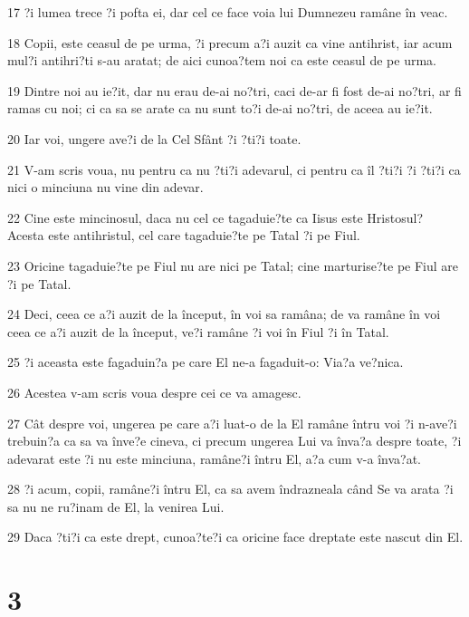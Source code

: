 \par 17 ?i lumea trece ?i pofta ei, dar cel ce face voia lui Dumnezeu ramâne în veac.
\par 18 Copii, este ceasul de pe urma, ?i precum a?i auzit ca vine antihrist, iar acum mul?i antihri?ti s-au aratat; de aici cunoa?tem noi ca este ceasul de pe urma.
\par 19 Dintre noi au ie?it, dar nu erau de-ai no?tri, caci de-ar fi fost de-ai no?tri, ar fi ramas cu noi; ci ca sa se arate ca nu sunt to?i de-ai no?tri, de aceea au ie?it.
\par 20 Iar voi, ungere ave?i de la Cel Sfânt ?i ?ti?i toate.
\par 21 V-am scris voua, nu pentru ca nu ?ti?i adevarul, ci pentru ca îl ?ti?i ?i ?ti?i ca nici o minciuna nu vine din adevar.
\par 22 Cine este mincinosul, daca nu cel ce tagaduie?te ca Iisus este Hristosul? Acesta este antihristul, cel care tagaduie?te pe Tatal ?i pe Fiul.
\par 23 Oricine tagaduie?te pe Fiul nu are nici pe Tatal; cine marturise?te pe Fiul are ?i pe Tatal.
\par 24 Deci, ceea ce a?i auzit de la început, în voi sa ramâna; de va ramâne în voi ceea ce a?i auzit de la început, ve?i ramâne ?i voi în Fiul ?i în Tatal.
\par 25 ?i aceasta este fagaduin?a pe care El ne-a fagaduit-o: Via?a ve?nica.
\par 26 Acestea v-am scris voua despre cei ce va amagesc.
\par 27 Cât despre voi, ungerea pe care a?i luat-o de la El ramâne întru voi ?i n-ave?i trebuin?a ca sa va înve?e cineva, ci precum ungerea Lui va înva?a despre toate, ?i adevarat este ?i nu este minciuna, ramâne?i întru El, a?a cum v-a înva?at.
\par 28 ?i acum, copii, ramâne?i întru El, ca sa avem îndrazneala când Se va arata ?i sa nu ne ru?inam de El, la venirea Lui.
\par 29 Daca ?ti?i ca este drept, cunoa?te?i ca oricine face dreptate este nascut din El.

\chapter{3}

